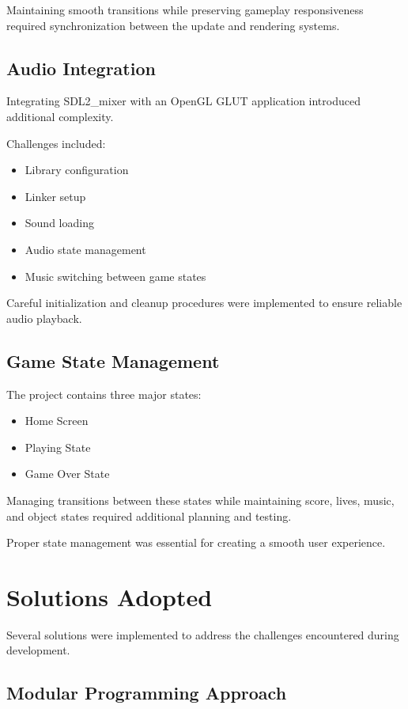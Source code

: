 \documentclass[12pt,a4paper]{report}
\begin{document}
Maintaining smooth transitions while preserving gameplay responsiveness required synchronization between the update and rendering systems.

\subsection*{Audio Integration}

Integrating SDL2\_mixer with an OpenGL GLUT application introduced additional complexity.

Challenges included:

\begin{itemize}
\item Library configuration
\item Linker setup
\item Sound loading
\item Audio state management
\item Music switching between game states
\end{itemize}

Careful initialization and cleanup procedures were implemented to ensure reliable audio playback.

\subsection*{Game State Management}

The project contains three major states:

\begin{itemize}
\item Home Screen
\item Playing State
\item Game Over State
\end{itemize}

Managing transitions between these states while maintaining score, lives, music, and object states required additional planning and testing.

Proper state management was essential for creating a smooth user experience.

\section{Solutions Adopted}

Several solutions were implemented to address the challenges encountered during development.

\subsection*{Modular Programming Approach}
\end{document}
